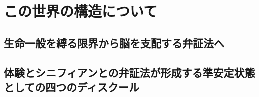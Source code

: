 



\frontmatter



\tableofcontents %

\mainmatter

\part{この世界の構造について}


\newpage


\newpage

\chapter{生命一般を縛る限界から脳を支配する弁証法へ}


\newpage

\newpage



\newpage



\newpage

\newpage

\newpage


\chapter{体験とシニフィアンとの弁証法が形成する準安定状態としての四つのディスクール}


\newpage

\newpage



\newpage

\newpage

\newpage


